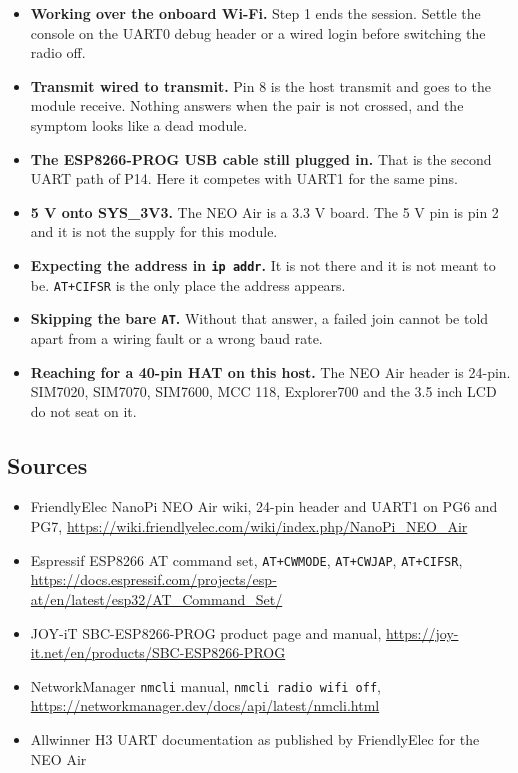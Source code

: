 \begin{itemize}
\item \textbf{Working over the onboard Wi-Fi.} Step 1 ends the session. Settle the console on the UART0 debug header or a wired login before switching the radio off.
\item \textbf{Transmit wired to transmit.} Pin 8 is the host transmit and goes to the module receive. Nothing answers when the pair is not crossed, and the symptom looks like a dead module.
\item \textbf{The ESP8266-PROG USB cable still plugged in.} That is the second UART path of P14. Here it competes with UART1 for the same pins.
\item \textbf{5 V onto SYS\_3V3.} The NEO Air is a 3.3 V board. The 5 V pin is pin 2 and it is not the supply for this module.
\item \textbf{Expecting the address in \texttt{ip addr}.} It is not there and it is not meant to be. \texttt{AT+CIFSR} is the only place the address appears.
\item \textbf{Skipping the bare \texttt{AT}.} Without that answer, a failed join cannot be told apart from a wiring fault or a wrong baud rate.
\item \textbf{Reaching for a 40-pin HAT on this host.} The NEO Air header is 24-pin. SIM7020, SIM7070, SIM7600, MCC 118, Explorer700 and the 3.5 inch LCD do not seat on it.
\end{itemize}

\subsection*{Sources}

\begin{itemize}
\item FriendlyElec NanoPi NEO Air wiki, 24-pin header and UART1 on PG6 and PG7, \url{https://wiki.friendlyelec.com/wiki/index.php/NanoPi_NEO_Air}
\item Espressif ESP8266 AT command set, \texttt{AT+CWMODE}, \texttt{AT+CWJAP}, \texttt{AT+CIFSR}, \url{https://docs.espressif.com/projects/esp-at/en/latest/esp32/AT_Command_Set/}
\item JOY-iT SBC-ESP8266-PROG product page and manual, \url{https://joy-it.net/en/products/SBC-ESP8266-PROG}
\item NetworkManager \texttt{nmcli} manual, \texttt{nmcli radio wifi off}, \url{https://networkmanager.dev/docs/api/latest/nmcli.html}
\item Allwinner H3 UART documentation as published by FriendlyElec for the NEO Air
\end{itemize}
